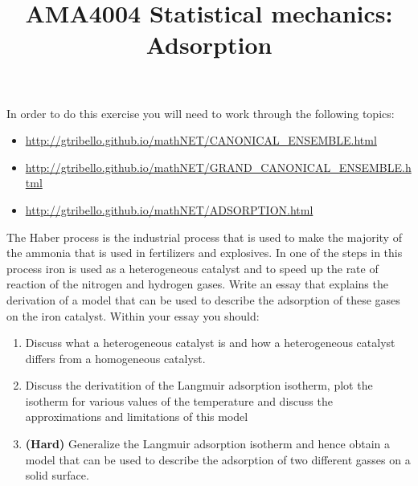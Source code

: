 \documentclass[a4paper]{article}
\title{
\vspace{-3em}
\begin{tcolorbox}
\Huge\sffamily AMA4004 Statistical mechanics: Adsorption
\end{tcolorbox}
\vspace{-3em}
}
\date{}
\begin{document}
\maketitle

In order to do this exercise you will need to work through the following topics:

\begin{itemize}
\item \href{http://gtribello.github.io/mathNET/CANONICAL\_ENSEMBLE.html}{http://gtribello.github.io/mathNET/CANONICAL\_ENSEMBLE.html}
\item \href{http://gtribello.github.io/mathNET/GRAND\_CANONICAL\_ENSEMBLE.html}{http://gtribello.github.io/mathNET/GRAND\_CANONICAL\_ENSEMBLE.html}
\item \href{http://gtribello.github.io/mathNET/ADSORPTION.html}{http://gtribello.github.io/mathNET/ADSORPTION.html}
\end{itemize}

The Haber process is the industrial process that is used to make the majority of the ammonia that is used in fertilizers and explosives.  In one of the steps in this process iron is used as a heterogeneous catalyst and to speed up the rate of reaction 
of the nitrogen and hydrogen gases.  Write an essay that explains the derivation of a model that can be used to describe the adsorption of these gases on the iron catalyst.  Within your essay you should:   

\begin{enumerate}
\item Discuss what a heterogeneous catalyst is and how a heterogeneous catalyst differs from a homogeneous catalyst.
\item Discuss the derivatition of the Langmuir adsorption isotherm, plot the isotherm for various values of the temperature and discuss the approximations and limitations of this model 
\item {\bf (Hard)} Generalize the Langmuir adsorption isotherm and hence obtain a model that can be used to describe the adsorption of two different gasses on a solid surface.
\end{enumerate}
\end{document}
